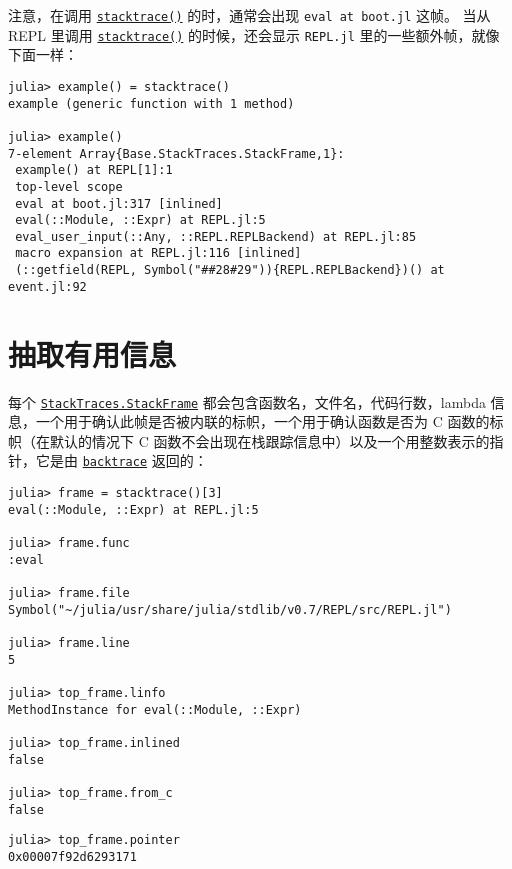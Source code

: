 注意，在调用 \hyperlink{11964270650763140298}{\texttt{stacktrace()}} 的时，通常会出现 \texttt{eval at boot.jl} 这帧。 当从 REPL 里调用 \hyperlink{11964270650763140298}{\texttt{stacktrace()}} 的时候，还会显示 \texttt{REPL.jl} 里的一些额外帧，就像下面一样：




\begin{verbatim}
julia> example() = stacktrace()
example (generic function with 1 method)

julia> example()
7-element Array{Base.StackTraces.StackFrame,1}:
 example() at REPL[1]:1
 top-level scope
 eval at boot.jl:317 [inlined]
 eval(::Module, ::Expr) at REPL.jl:5
 eval_user_input(::Any, ::REPL.REPLBackend) at REPL.jl:85
 macro expansion at REPL.jl:116 [inlined]
 (::getfield(REPL, Symbol("##28#29")){REPL.REPLBackend})() at event.jl:92
\end{verbatim}



\hypertarget{17184729199221037868}{}


\section{抽取有用信息}



每个 \hyperlink{16824886840215699957}{\texttt{StackTraces.StackFrame}} 都会包含函数名，文件名，代码行数，lambda 信息，一个用于确认此帧是否被内联的标帜，一个用于确认函数是否为 C 函数的标帜（在默认的情况下 C 函数不会出现在栈跟踪信息中）以及一个用整数表示的指针，它是由 \hyperlink{6187626674327343338}{\texttt{backtrace}} 返回的：




\begin{verbatim}
julia> frame = stacktrace()[3]
eval(::Module, ::Expr) at REPL.jl:5

julia> frame.func
:eval

julia> frame.file
Symbol("~/julia/usr/share/julia/stdlib/v0.7/REPL/src/REPL.jl")

julia> frame.line
5

julia> top_frame.linfo
MethodInstance for eval(::Module, ::Expr)

julia> top_frame.inlined
false

julia> top_frame.from_c
false
\end{verbatim}




\begin{verbatim}
julia> top_frame.pointer
0x00007f92d6293171
\end{verbatim}



